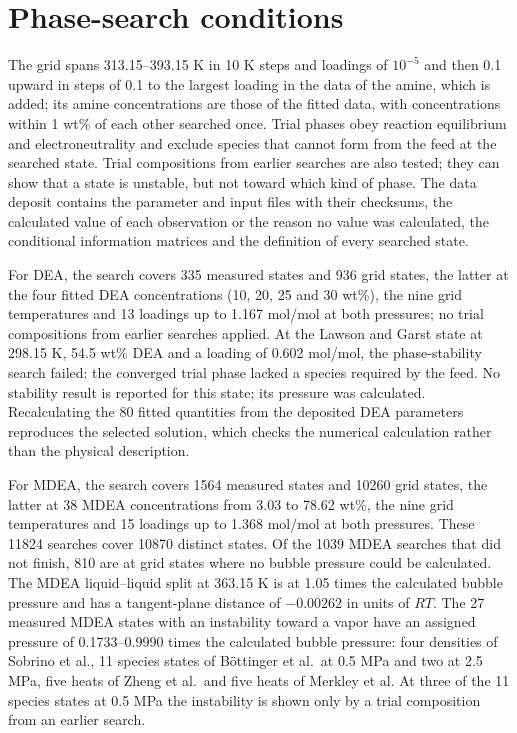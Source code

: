 \section{Phase-search conditions}\label{sec:p2-s-numerical}
The grid spans 313.15--393.15 K in 10 K steps and loadings of $10^{-5}$ and then 0.1 upward in steps of 0.1 to the largest loading in the data of the amine, which is added; its amine concentrations are those of the fitted data, with concentrations within 1 wt\% of each other searched once.
Trial phases obey reaction equilibrium and electroneutrality and exclude species that cannot form from the feed at the searched state.
Trial compositions from earlier searches are also tested; they can show that a state is unstable, but not toward which kind of phase.
The data deposit contains the parameter and input files with their checksums, the calculated value of each observation or the reason no value was calculated, the conditional information matrices and the definition of every searched state.

For DEA, the search covers 335 measured states and 936 grid states, the latter at the four fitted DEA concentrations (10, 20, 25 and 30 wt\%), the nine grid temperatures and 13 loadings up to 1.167 mol/mol at both pressures; no trial compositions from earlier searches applied.
At the Lawson and Garst state at 298.15 K, 54.5 wt\% DEA and a loading of 0.602 mol/mol, the phase-stability search failed: the converged trial phase lacked a species required by the feed.
No stability result is reported for this state; its pressure was calculated.
Recalculating the 80 fitted quantities from the deposited DEA parameters reproduces the selected solution, which checks the numerical calculation rather than the physical description.

For MDEA, the search covers 1564 measured states and 10260 grid states, the latter at 38 MDEA concentrations from 3.03 to 78.62 wt\%, the nine grid temperatures and 15 loadings up to 1.368 mol/mol at both pressures.
These 11824 searches cover 10870 distinct states.
Of the 1039 MDEA searches that did not finish, 810 are at grid states where no bubble pressure could be calculated.
The MDEA liquid--liquid split at 363.15 K is at 1.05 times the calculated bubble pressure and has a tangent-plane distance of $-0.00262$ in units of $RT$.
The 27 measured MDEA states with an instability toward a vapor have an assigned pressure of 0.1733--0.9990 times the calculated bubble pressure: four densities of Sobrino et al., 11 species states of B\"ottinger et al.\ at 0.5 MPa and two at 2.5 MPa, five heats of Zheng et al.\ and five heats of Merkley et al.
At three of the 11 species states at 0.5 MPa the instability is shown only by a trial composition from an earlier search.

